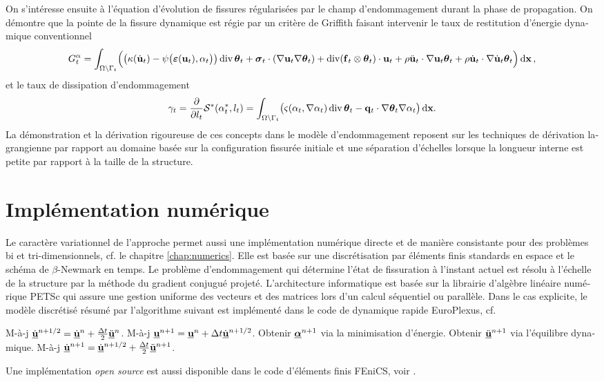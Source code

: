 \begin{otherlanguage}{french}
On s'intéresse ensuite à l'équation d'évolution de fissures régularisées par le champ d'endommagement durant la phase de propagation. On démontre que la pointe de la fissure dynamique est régie par un critère de Griffith faisant intervenir le taux de restitution d'énergie dynamique conventionnel
\begin{equation*}
G_t^\alpha=\int_\domaint\Bigl(\bigl(\kappa(\dot{\vec{u}}_t)-\psi\bigl(\eps(\vec{u}_t),\alpha_t\bigr)\bigr)\div\vtheta_t+\sig_t\cdot(\nabla\vec{u}_t\nabla\vtheta_t)+\div(\vec{f}_t\otimes\vtheta_t)\cdot\vec{u}_t+\rho\ddot{\vec{u}}_t\cdot\nabla\vec{u}_t\vtheta_t+\rho\dot{\vec{u}}_t\cdot\nabla\dot{\vec{u}}_t\vtheta_t\Bigr)\dx\,,
\end{equation*}
et le taux de dissipation d'endommagement
\begin{equation*}
\gamma_t=\frac{\partial}{\partial l_t}\mathcal{S}^*(\alpha^*_t,l_t)=\int_\domaint\bigl(\varsigma(\alpha_t,\nabla\alpha_t)\div\vtheta_t-\vec{q}_t\cdot\nabla\vtheta_t\nabla\alpha_t\bigr)\dx.
\end{equation*}
La démonstration et la dérivation rigoureuse de ces concepts dans le modèle d'endommagement reposent sur les techniques de dérivation lagrangienne par rapport au domaine basée sur la configuration fissurée initiale et une séparation d'échelles lorsque la longueur interne est petite par rapport à la taille de la structure.

\section*{Implémentation numérique}
Le caractère variationnel de l'approche permet aussi une implémentation numérique directe et de manière consistante pour des problèmes bi et tri-dimensionnels, cf. le chapitre \ref{chap:numerics}. Elle est basée sur une discrétisation par éléments finis standards en espace et le schéma de $\beta$-Newmark en temps. Le problème d'endommagement qui détermine l'état de fissuration à l'instant actuel est résolu à l'échelle de la structure par la méthode du gradient conjugué projeté. L'architecture informatique est basée sur la librairie d'algèbre linéaire numérique PETSc qui assure une gestion uniforme des vecteurs et des matrices lors d'un calcul séquentiel ou parallèle. Dans le cas explicite, le modèle discrétisé résumé par l'algorithme suivant est implémenté dans le code de dynamique rapide EuroPlexus, cf. \cite{EPX:2015}
\begin{algorithmic}[1]\linespread{1.2}\selectfont\normalsize
{}
  \State M-à-j $\dot{\uvec}^{n+1/2}=\dot{\uvec}^{n}+\frac{\Delta t}{2}\ddot{\uvec}^n$.
  \State M-à-j $\uvec^{n+1}=\uvec^n+\Delta t\dot{\uvec}^{n+1/2}$.
  \State Obtenir $\dvec^{n+1}$ via la minimisation d'énergie.
  \State Obtenir $\ddot{\uvec}^{n+1}$ via l'équilibre dynamique.
  \State M-à-j $\dot{\uvec}^{n+1}=\dot{\uvec}^{n+1/2}+\frac{\Delta t}{2}\ddot{\uvec}^{n+1}$.
\EndFor
\end{algorithmic}
Une implémentation \emph{open source} est aussi disponible dans le code d'éléments finis FEniCS, voir \cite{LiMaurini:2015}.


\end{otherlanguage}
